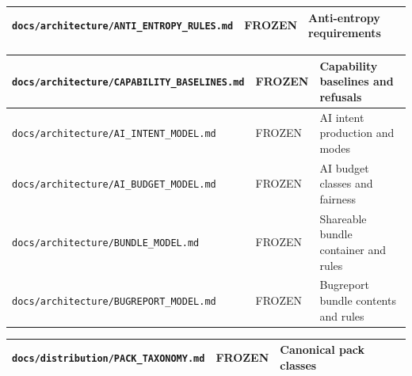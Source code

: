 \documentclass[9pt,a4paper,openany]{book}
\newcommand{\toprule}{\hline}
\newcommand{\midrule}{\hline}
\newcommand{\bottomrule}{\hline}
\begin{document}
\begin{center}
{\small\renewcommand{\arraystretch}{1.18}
\begin{tabularx}{\linewidth}{@{}>{\raggedright\arraybackslash}X >{\raggedright\arraybackslash}X >{\raggedright\arraybackslash}X@{}}
\toprule
\textbf{\texttt{docs/\allowbreak{}architecture/\allowbreak{}ANTI\_\allowbreak{}ENTROPY\_\allowbreak{}RULES.\allowbreak{}md}} & \textbf{FROZEN} & \textbf{Anti-\allowbreak{}entropy requirements} \\
\midrule
\bottomrule
\end{tabularx}
}
\end{center}


\begin{center}
{\small\renewcommand{\arraystretch}{1.18}
\begin{tabularx}{\linewidth}{@{}>{\raggedright\arraybackslash}X >{\raggedright\arraybackslash}X >{\raggedright\arraybackslash}X@{}}
\toprule
\textbf{\texttt{docs/\allowbreak{}architecture/\allowbreak{}CAPABILITY\_\allowbreak{}BASELINES.\allowbreak{}md}} & \textbf{FROZEN} & \textbf{Capability baselines and refusals} \\
\midrule
\texttt{docs/\allowbreak{}architecture/\allowbreak{}AI\_\allowbreak{}INTENT\_\allowbreak{}MODEL.\allowbreak{}md} & FROZEN & AI intent production and modes \\
\texttt{docs/\allowbreak{}architecture/\allowbreak{}AI\_\allowbreak{}BUDGET\_\allowbreak{}MODEL.\allowbreak{}md} & FROZEN & AI budget classes and fairness \\
\texttt{docs/\allowbreak{}architecture/\allowbreak{}BUNDLE\_\allowbreak{}MODEL.\allowbreak{}md} & FROZEN & Shareable bundle container and rules \\
\texttt{docs/\allowbreak{}architecture/\allowbreak{}BUGREPORT\_\allowbreak{}MODEL.\allowbreak{}md} & FROZEN & Bugreport bundle contents and rules \\
\bottomrule
\end{tabularx}
}
\end{center}


\begin{center}
{\small\renewcommand{\arraystretch}{1.18}
\begin{tabularx}{\linewidth}{@{}>{\raggedright\arraybackslash}X >{\raggedright\arraybackslash}X >{\raggedright\arraybackslash}X@{}}
\toprule
\textbf{\texttt{docs/\allowbreak{}distribution/\allowbreak{}PACK\_\allowbreak{}TAXONOMY.\allowbreak{}md}} & \textbf{FROZEN} & \textbf{Canonical pack classes} \\
\midrule
\bottomrule
\end{tabularx}
}
\end{center}
\end{document}
